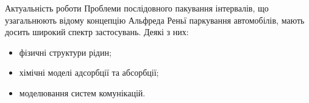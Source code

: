 \begin{frame}{Актуальність роботи}
	Проблеми послідовного пакування інтервалів, що узагальнюють відому концепцію Альфреда Реньї паркування автомобілів, мають досить широкий спектр застосувань. Деякі з них:
	\begin{itemize}
		\item фізичні структури рідин;
		\item хімічні моделі адсорбції та абсорбції;
		\item моделювання систем комунікацій.
	\end{itemize}
\end{frame}
\note{
}